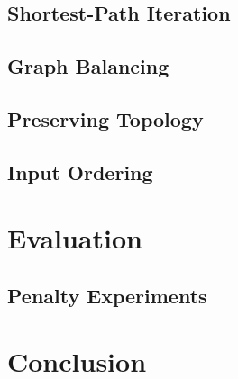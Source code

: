 \documentclass{sig-alternate-sigmod09}
\begin{document}
\subsection{Shortest-Path Iteration}

\subsection{Graph Balancing}

\subsection{Preserving Topology}

\subsection{Input Ordering}

\section{Evaluation}

\subsection{Penalty Experiments}

\section{Conclusion}

\balancecolumns
\end{document}
